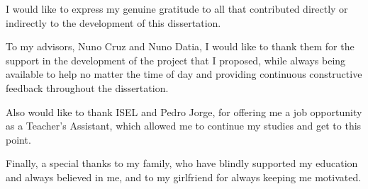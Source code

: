 \acknowledgements

I would like to express my genuine gratitude to all that contributed directly or indirectly to the development of this dissertation.

To my advisors, Nuno Cruz and Nuno Datia, I would like to thank them for the support in the development of the project that I proposed, while always being available to help no matter the time of day and providing continuous constructive feedback throughout the dissertation.

Also would like to thank ISEL and Pedro Jorge, for offering me a job opportunity as a Teacher's Assistant, which allowed me to continue my studies and get to this point.

Finally, a special thanks to my family, who have blindly supported my education and always believed in me, and to my girlfriend for always keeping me motivated.